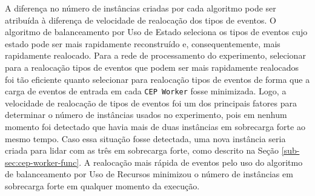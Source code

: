 A diferença no número de instâncias criadas por cada algoritmo pode ser atribuída à diferença de velocidade de realocação dos tipos de eventos. O algoritmo de balanceamento por Uso de Estado seleciona os tipos de eventos cujo estado pode ser mais rapidamente reconstruído e, consequentemente, mais rapidamente realocado. Para a rede de processamento do experimento, selecionar para a realocação tipos de eventos que podem ser mais rapidamente realocados foi tão eficiente quanto selecionar para realocação tipos de eventos de forma que a carga de eventos de entrada em cada \texttt{CEP Worker} fosse minimizada. Logo, a velocidade de realocação de tipos de eventos foi um dos principais fatores para determinar o número de instâncias usados no experimento, pois em nenhum momento foi detectado que havia mais de duas instâncias em sobrecarga forte ao mesmo tempo. Caso essa situação fosse detectada, uma nova instância seria criada para lidar com as três em sobrecarga forte, como descrito na Seção \ref{sub-sec:cep-worker-func}. A realocação mais rápida de eventos pelo uso do algoritmo de balanceamento por Uso de Recursos minimizou o número de instâncias em sobrecarga forte em qualquer momento da execução. 

\newpage
